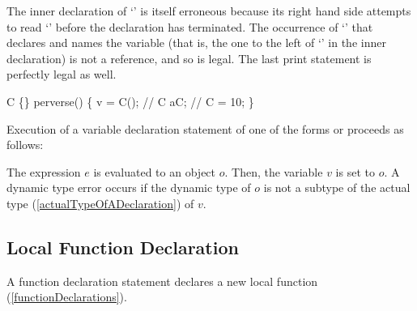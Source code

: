 \documentclass[makeidx]{article}
\begin{document}
{{The inner declaration of `' is itself erroneous
because its right hand side attempts to
read `' before the declaration has terminated.
The occurrence of `' that declares and names the variable
(that is, the one to the left of `\code{=}' in the inner declaration)
is not a reference, and so is legal.
The last print statement is perfectly legal as well.
}


\begin{dartCode}
\CLASS{} C \{\}
perverse() \{
   \VAR{} v = \NEW{} C(); // 
   C aC; // 
   \VAR{} C = 10;
\}
\end{dartCode}


\LMHash{}%
Execution of a variable declaration statement of one of the forms
 or
proceeds as follows:

\LMHash{}%
The expression $e$ is evaluated to an object $o$.
Then, the variable $v$ is set to $o$.
A dynamic type error occurs
if the dynamic type of $o$ is not a subtype of the actual type
(\ref{actualTypeOfADeclaration})
of $v$.



\subsection{Local Function Declaration}

\LMHash{}%
A function declaration statement declares a new local function (\ref{functionDeclarations}).

}
\end{document}
